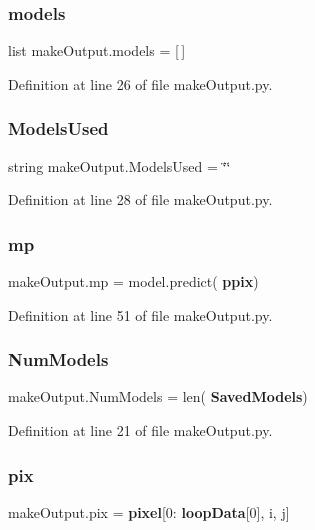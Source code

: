 \subsubsection{models}
{\footnotesize\ttfamily list make\+Output.\+models = [$\,$]}



Definition at line 26 of file make\+Output.\+py.

\mbox{\label{namespacemake_output_ae26693c032b5247ccd6b104f2491df60}} 
\subsubsection{Models\+Used}
{\footnotesize\ttfamily string make\+Output.\+Models\+Used = \char`\"{}\char`\"{}}



Definition at line 28 of file make\+Output.\+py.

\mbox{\label{namespacemake_output_ac91dbd593b65254e7a7522bae2b2a665}} 
\subsubsection{mp}
{\footnotesize\ttfamily make\+Output.\+mp = model.\+predict(\textbf{ ppix})}



Definition at line 51 of file make\+Output.\+py.

\mbox{\label{namespacemake_output_a20376d43bacf50cfa4faa7a87b9e1f8c}} 
\subsubsection{Num\+Models}
{\footnotesize\ttfamily make\+Output.\+Num\+Models = len(\textbf{ Saved\+Models})}



Definition at line 21 of file make\+Output.\+py.

\mbox{\label{namespacemake_output_a89e3afe2a95494a7ddd3f3efa85596f6}} 
\subsubsection{pix}
{\footnotesize\ttfamily make\+Output.\+pix = \textbf{ pixel}[0\+:\textbf{ loop\+Data}[0], i, j]}



